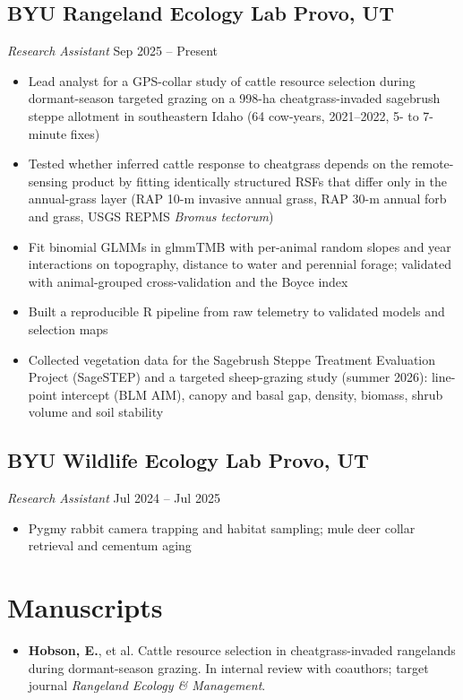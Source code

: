 \documentclass[11pt]{article}
\begin{document}
\subsection*{BYU Rangeland Ecology Lab \hfill Provo, UT}
\textit{Research Assistant} \hfill Sep 2025 -- Present
\begin{itemize}
\item Lead analyst for a GPS-collar study of cattle resource selection during dormant-season
  targeted grazing on a 998-ha cheatgrass-invaded sagebrush steppe allotment in southeastern Idaho
  (64 cow-years, 2021--2022, 5- to 7-minute fixes)
\item Tested whether inferred cattle response to cheatgrass depends on the remote-sensing product
  by fitting identically structured RSFs that differ only in the annual-grass layer
  (RAP 10-m invasive annual grass, RAP 30-m annual forb and grass, USGS REPMS \textit{Bromus tectorum})
\item Fit binomial GLMMs in glmmTMB with per-animal random slopes and year interactions on
  topography, distance to water and perennial forage; validated with animal-grouped
  cross-validation and the Boyce index
\item Built a reproducible R pipeline from raw telemetry to validated models and selection maps
\item Collected vegetation data for the Sagebrush Steppe Treatment Evaluation Project (SageSTEP) and
  a targeted sheep-grazing study (summer 2026): line-point intercept (BLM AIM), canopy and basal
  gap, density, biomass, shrub volume and soil stability
\end{itemize}

\subsection*{BYU Wildlife Ecology Lab \hfill Provo, UT}
\textit{Research Assistant} \hfill Jul 2024 -- Jul 2025
\begin{itemize}
\item Pygmy rabbit camera trapping and habitat sampling; mule deer collar retrieval and cementum aging
\end{itemize}

\section*{Manuscripts}
\begin{itemize}
\item \textbf{Hobson, E.}, et al. Cattle resource selection in cheatgrass-invaded rangelands during
  dormant-season grazing. In internal review with coauthors; target journal
  \textit{Rangeland Ecology \& Management}.
\end{itemize}
\end{document}
